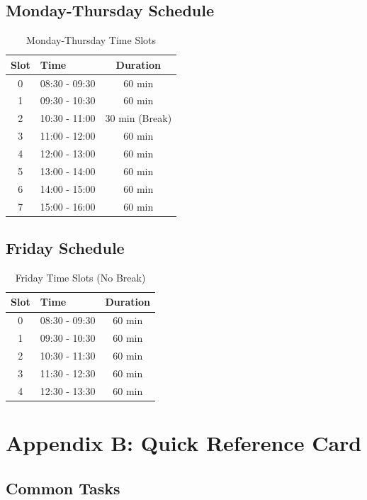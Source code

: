 \documentclass[12pt,a4paper]{article}
\begin{document}
\subsection{Monday-Thursday Schedule}

\begin{table}[h]
\centering
\begin{tabular}{@{}clc@{}}
\toprule
\textbf{Slot} & \textbf{Time} & \textbf{Duration} \\ \midrule
0 & 08:30 - 09:30 & 60 min \\
1 & 09:30 - 10:30 & 60 min \\
2 & 10:30 - 11:00 & 30 min (Break) \\
3 & 11:00 - 12:00 & 60 min \\
4 & 12:00 - 13:00 & 60 min \\
5 & 13:00 - 14:00 & 60 min \\
6 & 14:00 - 15:00 & 60 min \\
7 & 15:00 - 16:00 & 60 min \\
\bottomrule
\end{tabular}
\caption{Monday-Thursday Time Slots}
\end{table}

\subsection{Friday Schedule}

\begin{table}[h]
\centering
\begin{tabular}{@{}clc@{}}
\toprule
\textbf{Slot} & \textbf{Time} & \textbf{Duration} \\ \midrule
0 & 08:30 - 09:30 & 60 min \\
1 & 09:30 - 10:30 & 60 min \\
2 & 10:30 - 11:30 & 60 min \\
3 & 11:30 - 12:30 & 60 min \\
4 & 12:30 - 13:30 & 60 min \\
\bottomrule
\end{tabular}
\caption{Friday Time Slots (No Break)}
\end{table}

\section{Appendix B: Quick Reference Card}

\subsection{Common Tasks}
\end{document}
